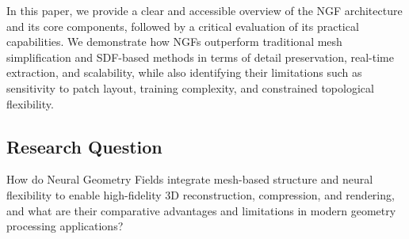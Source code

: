 In this paper, we provide a clear and accessible overview of the NGF architecture and its core components, followed by a critical evaluation of its practical capabilities.  
We demonstrate how NGFs outperform traditional mesh simplification and SDF-based methods in terms of detail preservation, real-time extraction, and scalability, while also identifying their limitations such as sensitivity to patch layout, training complexity, and constrained topological flexibility.  

\subsection*{Research Question}  
How do Neural Geometry Fields integrate mesh-based structure and neural flexibility to enable high-fidelity 3D reconstruction, compression, and rendering, and what are their comparative advantages and limitations in modern geometry processing applications?